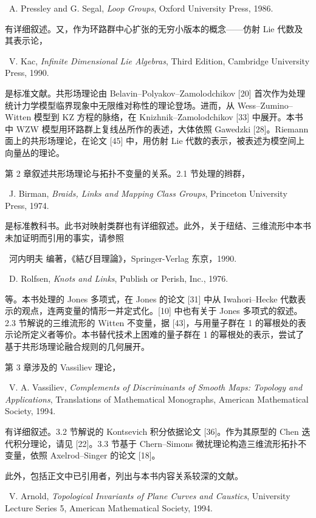 \noindent [7]\ A. Pressley and G. Segal, \textit{Loop Groups}, Oxford University Press, 1986.

\noindent 有详细叙述。又，作为环路群中心扩张的无穷小版本的概念------仿射 Lie 代数及其表示论，

\noindent [8]\ V. Kac, \textit{Infinite Dimensional Lie Algebras}, Third Edition, Cambridge University Press, 1990.

\noindent 是标准文献。共形场理论由 Belavin--Polyakov--Zamolodchikov [20] 首次作为处理统计力学模型临界现象中无限维对称性的理论登场。进而，从 Wess--Zumino--Witten 模型到 KZ 方程的脉络，在 Knizhnik--Zamolodchikov [33] 中展开。本书中 WZW 模型用环路群上复线丛所作的表述，大体依照 Gawedzki [28]。Riemann 面上的共形场理论，在论文 [45] 中，用仿射 Lie 代数的表示，被表述为模空间上向量丛的理论。

第 2 章叙述共形场理论与拓扑不变量的关系。2.1 节处理的辫群，

\noindent [9]\ J. Birman, \textit{Braids, Links and Mapping Class Groups}, Princeton University Press, 1974.

\noindent 是标准教科书。此书对映射类群也有详细叙述。此外，关于纽结、三维流形中本书未加证明而引用的事实，请参照

\noindent [10]\ 河内明夫 编著，《結び目理論》，Springer-Verlag 东京，1990.

\noindent [11]\ D. Rolfsen, \textit{Knots and Links}, Publish or Perish, Inc., 1976.

\noindent 等。本书处理的 Jones 多项式，在 Jones 的论文 [31] 中从 Iwahori--Hecke 代数表示的观点，连两变量的情形一并定式化。[10] 中也有关于 Jones 多项式的叙述。2.3 节解说的三维流形的 Witten 不变量，据 [43]，与用量子群在 1 的幂根处的表示论所定义者等价。本书替代技术上困难的量子群在 1 的幂根处的表示，尝试了基于共形场理论融合规则的几何展开。

第 3 章涉及的 Vassiliev 理论，

\noindent [12]\ V. A. Vassiliev, \textit{Complements of Discriminants of Smooth Maps: Topology and Applications}, Translations of Mathematical Monographs, American Mathematical Society, 1994.

\noindent 有详细叙述。3.2 节解说的 Kontsevich 积分依据论文 [36]。作为其原型的 Chen 迭代积分理论，请见 [22]。3.3 节基于 Chern--Simons 微扰理论构造三维流形拓扑不变量，依照 Axelrod--Singer 的论文 [18]。

\noindent 此外，包括正文中已引用者，列出与本书内容关系较深的文献。

\noindent [13]\ V. Arnold, \textit{Topological Invariants of Plane Curves and Caustics}, University Lecture Series 5, American Mathematical Society, 1994.

